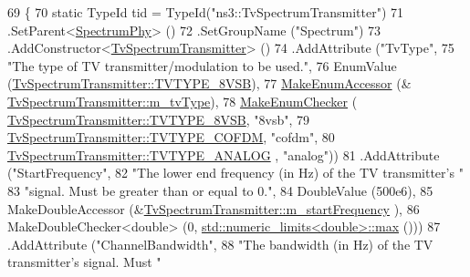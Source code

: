 \begin{DoxyCode}
69 \{
70   \textcolor{keyword}{static} TypeId tid = TypeId(\textcolor{stringliteral}{"ns3::TvSpectrumTransmitter"})
71     .SetParent<\hyperlink{classns3_1_1SpectrumPhy_a207bd7373a9fd3b7f8d8e00380a0e7e4}{SpectrumPhy}> ()
72     .SetGroupName (\textcolor{stringliteral}{"Spectrum"})
73     .AddConstructor<\hyperlink{classns3_1_1TvSpectrumTransmitter_afcc26ad106aff1fb09e1c2d4ac214117}{TvSpectrumTransmitter}> ()
74     .AddAttribute (\textcolor{stringliteral}{"TvType"},
75                    \textcolor{stringliteral}{"The type of TV transmitter/modulation to be used."},
76                    EnumValue (\hyperlink{classns3_1_1TvSpectrumTransmitter_a9ec4fd6860d2d287b1304397b425f0d8aeca316e65358d933299c96fbab39a325}{TvSpectrumTransmitter::TVTYPE\_8VSB}),
77                    \hyperlink{namespacens3_af5050739867ce63896dec011e332c8ec}{MakeEnumAccessor} (&
      \hyperlink{classns3_1_1TvSpectrumTransmitter_a78373632fd774cf3c26675dc0379ca13}{TvSpectrumTransmitter::m\_tvType}),
78                    \hyperlink{namespacens3_a48832781a2b521d3d0091e05ece30615}{MakeEnumChecker} (
      \hyperlink{classns3_1_1TvSpectrumTransmitter_a9ec4fd6860d2d287b1304397b425f0d8aeca316e65358d933299c96fbab39a325}{TvSpectrumTransmitter::TVTYPE\_8VSB}, \textcolor{stringliteral}{"8vsb"},
79                                     \hyperlink{classns3_1_1TvSpectrumTransmitter_a9ec4fd6860d2d287b1304397b425f0d8a6afcc538d373d5f28efbf4c9458393b2}{TvSpectrumTransmitter::TVTYPE\_COFDM},
       \textcolor{stringliteral}{"cofdm"},
80                                     \hyperlink{classns3_1_1TvSpectrumTransmitter_a9ec4fd6860d2d287b1304397b425f0d8aca916f93508d6edae3c6bd5af2afcdc4}{TvSpectrumTransmitter::TVTYPE\_ANALOG}
      , \textcolor{stringliteral}{"analog"}))
81     .AddAttribute (\textcolor{stringliteral}{"StartFrequency"},
82                    \textcolor{stringliteral}{"The lower end frequency (in Hz) of the TV transmitter's "}
83                    \textcolor{stringliteral}{"signal. Must be greater than or equal to 0."},
84                    DoubleValue (500e6),
85                    MakeDoubleAccessor (&\hyperlink{classns3_1_1TvSpectrumTransmitter_a776e1f1e5c91d1d4a457e26b0fc29375}{TvSpectrumTransmitter::m\_startFrequency}
      ),
86                    MakeDoubleChecker<double> (0, 
      \hyperlink{80211b_8c_affe776513b24d84b39af8ab0930fef7f}{std::numeric\_limits<double>::max} ()))
87     .AddAttribute (\textcolor{stringliteral}{"ChannelBandwidth"},
88                    \textcolor{stringliteral}{"The bandwidth (in Hz) of the TV transmitter's signal. Must "}

\end{DoxyCode}
